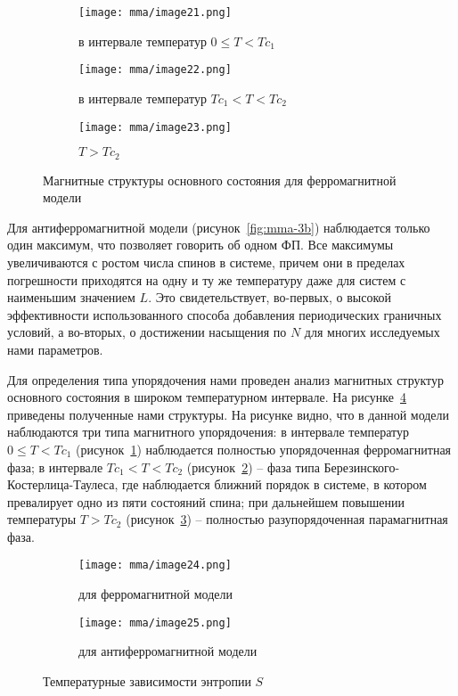 \begin{figure}[ht]
    \begin{subfigure}{0.33\textwidth}
        \texttt{[image: mma/image21.png]}
        \caption{в интервале температур $0 \leq T < Tc_1$}
        \label{fig:mma-4a}
    \end{subfigure}
    \begin{subfigure}{0.33\textwidth}
        \texttt{[image: mma/image22.png]}
        \caption{в интервале температур $Tc_1 < T < Tc_2$}
        \label{fig:mma-4b}
    \end{subfigure}
    \begin{subfigure}{0.33\textwidth}
        \texttt{[image: mma/image23.png]}
        \caption{$T > Tc_2$}
        \label{fig:mma-4c}
    \end{subfigure}
    \caption{Магнитные структуры основного состояния для ферромагнитной модели}
    \label{fig:mma-4}
\end{figure}

Для антиферромагнитной модели (рисунок~\ref{fig:mma-3b}) наблюдается только один максимум, что позволяет говорить об одном ФП. Все максимумы увеличиваются с ростом числа спинов в системе, причем они в пределах погрешности приходятся на одну и ту же температуру даже для систем с наименьшим значением $L$. Это свидетельствует, во-первых, о высокой эффективности использованного способа добавления периодических граничных условий, а во-вторых, о достижении насыщения по $N$ для многих исследуемых нами параметров.

Для определения типа упорядочения нами проведен анализ магнитных структур основного состояния в широком температурном интервале. На рисунке~\ref{fig:mma-4} приведены полученные нами структуры. На рисунке видно, что в данной модели наблюдаются три типа магнитного упорядочения: в интервале температур $0 \leq T < Tc_1$ (рисунок~\ref{fig:mma-4a}) наблюдается полностью упорядоченная ферромагнитная фаза; в интервале $Tc_1 < T < Tc_2$ (рисунок~\ref{fig:mma-4b}) -- фаза типа Березинского-Костерлица-Таулеса, где наблюдается ближний порядок в системе, в котором превалирует одно из пяти состояний спина; при дальнейшем повышении температуры $T > Tc_2$ (рисунок~\ref{fig:mma-4c}) -- полностью разупорядоченная парамагнитная фаза.

\begin{figure}[ht]
    \centering
    \begin{subfigure}{0.45\textwidth}
        \texttt{[image: mma/image24.png]}
        \caption{для ферромагнитной модели}
    \end{subfigure}
    \begin{subfigure}{0.45\textwidth}
        \texttt{[image: mma/image25.png]}
        \caption{для антиферромагнитной модели}
    \end{subfigure}
    \caption{Температурные зависимости энтропии $S$}
    \label{fig:mma-5}
\end{figure}

